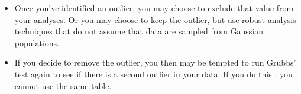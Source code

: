 \documentclass[a4paper,12pt]{article}
\begin{document}
\begin{itemize}
\item 
Once you've identified an outlier, you may choose to exclude that value from your analyses. Or you may choose to keep the outlier, but use robust analysis techniques that do not assume that data are sampled from Gaussian populations.

\item 
If you decide to remove the outlier, you then may be tempted to run Grubbs' test again to see if there is a second outlier in your data. If you do this , you cannot use the same table.
\end{itemize}
\end{document}
